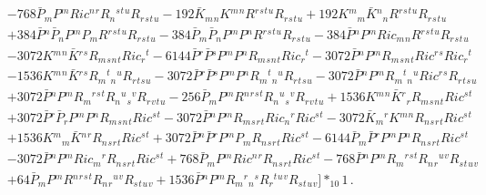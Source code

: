 \begin{align}
\nonumber \\&
  - 768 \bar{P}{}_{m} P{}^{m} Ric{}^{n}{}^{r} R{}_{n}{}^{s}{}^{t}{}^{u} R{}_{r}{}_{s}{}_{t}{}_{u}
  - 192 \bar{K}{}_{m}{}_{n} K{}^{m}{}^{n} R{}^{r}{}^{s}{}^{t}{}^{u} R{}_{r}{}_{s}{}_{t}{}_{u}
  + 192 K{}^{m}{}_{m} \bar{K}{}^{n}{}_{n} R{}^{r}{}^{s}{}^{t}{}^{u} R{}_{r}{}_{s}{}_{t}{}_{u}
\nonumber \\&
  + 384 \bar{P}{}^{n} \bar{P}{}_{n} P{}^{m} P{}_{m} R{}^{r}{}^{s}{}^{t}{}^{u} R{}_{r}{}_{s}{}_{t}{}_{u}
  - 384 \bar{P}{}_{m} \bar{P}{}_{n} P{}^{m} P{}^{n} R{}^{r}{}^{s}{}^{t}{}^{u} R{}_{r}{}_{s}{}_{t}{}_{u}
  - 384 \bar{P}{}^{n} P{}^{m} Ric{}_{m}{}_{n} R{}^{r}{}^{s}{}^{t}{}^{u} R{}_{r}{}_{s}{}_{t}{}_{u}
\nonumber \\&
  - 3072 K{}^{m}{}^{n} \bar{K}{}^{r}{}^{s} R{}_{m}{}_{s}{}_{n}{}_{t} Ric{}_{r}{}^{t}
  - 6144 \bar{P}{}^{r} \bar{P}{}^{s} P{}^{m} P{}^{n} R{}_{m}{}_{s}{}_{n}{}_{t} Ric{}_{r}{}^{t}
  - 3072 \bar{P}{}^{n} P{}^{m} R{}_{m}{}_{s}{}_{n}{}_{t} Ric{}^{r}{}^{s} Ric{}_{r}{}^{t}
\nonumber \\&
  - 1536 K{}^{m}{}^{n} \bar{K}{}^{r}{}^{s} R{}_{m}{}^{t}{}_{n}{}^{u} R{}_{r}{}_{t}{}_{s}{}_{u}
  - 3072 \bar{P}{}^{r} \bar{P}{}^{s} P{}^{m} P{}^{n} R{}_{m}{}^{t}{}_{n}{}^{u} R{}_{r}{}_{t}{}_{s}{}_{u}
  - 3072 \bar{P}{}^{n} P{}^{m} R{}_{m}{}^{t}{}_{n}{}^{u} Ric{}^{r}{}^{s} R{}_{r}{}_{t}{}_{s}{}_{u}
\nonumber \\&
  + 3072 \bar{P}{}^{n} P{}^{m} R{}_{m}{}^{r}{}^{s}{}^{t} R{}_{n}{}^{u}{}_{s}{}^{v} R{}_{r}{}_{v}{}_{t}{}_{u}
  - 256 \bar{P}{}_{m} P{}^{m} R{}^{n}{}^{r}{}^{s}{}^{t} R{}_{n}{}^{u}{}_{s}{}^{v} R{}_{r}{}_{v}{}_{t}{}_{u}
  + 1536 K{}^{m}{}^{n} \bar{K}{}^{r}{}_{r} R{}_{m}{}_{s}{}_{n}{}_{t} Ric{}^{s}{}^{t}
\nonumber \\&
  + 3072 \bar{P}{}^{r} \bar{P}{}_{r} P{}^{m} P{}^{n} R{}_{m}{}_{s}{}_{n}{}_{t} Ric{}^{s}{}^{t}
  - 3072 \bar{P}{}^{n} P{}^{m} R{}_{m}{}_{s}{}_{r}{}_{t} Ric{}_{n}{}^{r} Ric{}^{s}{}^{t}
  - 3072 \bar{K}{}_{m}{}^{r} K{}^{m}{}^{n} R{}_{n}{}_{s}{}_{r}{}_{t} Ric{}^{s}{}^{t}
\nonumber \\&
  + 1536 K{}^{m}{}_{m} \bar{K}{}^{n}{}^{r} R{}_{n}{}_{s}{}_{r}{}_{t} Ric{}^{s}{}^{t}
  + 3072 \bar{P}{}^{n} \bar{P}{}^{r} P{}^{m} P{}_{m} R{}_{n}{}_{s}{}_{r}{}_{t} Ric{}^{s}{}^{t}
  - 6144 \bar{P}{}_{m} \bar{P}{}^{r} P{}^{m} P{}^{n} R{}_{n}{}_{s}{}_{r}{}_{t} Ric{}^{s}{}^{t}
\nonumber \\&
  - 3072 \bar{P}{}^{n} P{}^{m} Ric{}_{m}{}^{r} R{}_{n}{}_{s}{}_{r}{}_{t} Ric{}^{s}{}^{t}
  + 768 \bar{P}{}_{m} P{}^{m} Ric{}^{n}{}^{r} R{}_{n}{}_{s}{}_{r}{}_{t} Ric{}^{s}{}^{t}
  - 768 \bar{P}{}^{n} P{}^{m} R{}_{m}{}^{r}{}^{s}{}^{t} R{}_{n}{}_{r}{}^{u}{}^{v} R{}_{s}{}_{t}{}_{u}{}_{v}
\nonumber \\&
  + 64 \bar{P}{}_{m} P{}^{m} R{}^{n}{}^{r}{}^{s}{}^{t} R{}_{n}{}_{r}{}^{u}{}^{v} R{}_{s}{}_{t}{}_{u}{}_{v}
  + 1536 \bar{P}{}^{n} P{}^{m} R{}_{m}{}^{r}{}_{n}{}^{s} R{}_{r}{}^{t}{}^{u}{}^{v} R{}_{s}{}_{t}{}_{u}{}_{v}
\bigg ] *_{10} 1 \,.
\end{align}
